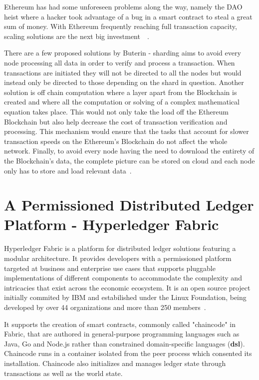 Ethereum has had some unforeseen problems along the way, namely the DAO heist
where a hacker took advantage of a bug in a smart contract to steal a great sum
of money. With Ethereum frequently reaching full transaction capacity, scaling
solutions are the next big investment~~\cite{ethereumScalability2018}.

There are a few proposed solutions by Buterin - sharding aims to avoid every
node processing all data in order to verify and process a transaction. When
transactions are initiated they will not be directed to all the nodes but would
instead only be directed to those depending on the shard in question.  Another
solution is off chain computation where a layer apart from the Blockchain is
created and where all the computation or solving of a complex mathematical
equation takes place. This would not only take the load off the Ethereum
Blockchain but also help decrease the cost of transaction verification and
processing. This mechanism would ensure that the tasks that account for slower
transaction speeds on the Ethereum’s Blockchain do not affect the whole
network. Finally, to avoid every node having the need to download the entirety
of the Blockchain's data, the complete picture can be stored on cloud and each
node only has to store and load relevant
data~\cite{ethereumBlogScalability2018}.

\section{A Permissioned Distributed Ledger Platform - Hyperledger Fabric}

Hyperledger Fabric is a platform for distributed ledger solutions featuring a
modular architecture. It provides developers with a permissioned platform
targeted at business and enterprise use cases that supports pluggable
implementations of different components to accommodate the complexity and
intricacies that exist across the economic ecosystem. It is an open source
project initially commited by IBM  and estabilished under the Linux Foundation,
being developed by over 44 organizations and more than 250
members~\cite{HyperledgerFabricDocs2017,HyperledgerGrowth2018}.

It supports the creation of smart contracts, commonly called "chaincode" in
Fabric, that are authored in general-purpose programming languages such as
Java, Go and Node.js rather than constrained domain-specific languages
(\textbf{dsl}). Chaincode runs in a container isolated from the
peer process which consented its installation. Chaincode also initializes and
manages ledger state through transactions as well as the world state.

